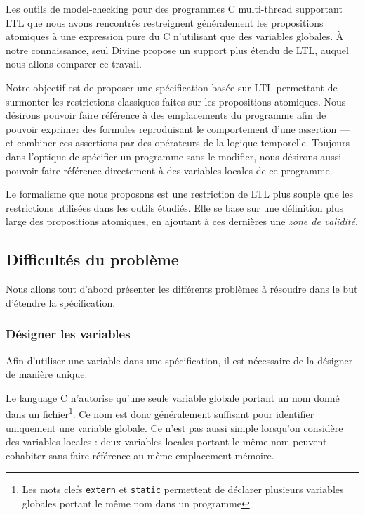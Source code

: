 Les outils de model-checking pour des programmes C multi-thread
supportant LTL que nous avons rencontrés restreignent généralement les
propositions atomiques à une expression pure du C n'utilisant que des
variables globales. À notre connaissance, seul
Divine\cite{Divine_LTL} propose un support plus étendu de LTL,
auquel nous allons comparer ce travail.

Notre objectif est de proposer une spécification basée sur LTL
permettant de surmonter les restrictions classiques faites sur les
propositions atomiques. Nous désirons pouvoir faire référence à des
emplacements du programme afin de pouvoir exprimer des formules
reproduisant le comportement d'une assertion --- et combiner ces
assertions par des opérateurs de la logique temporelle. Toujours dans
l'optique de spécifier un programme sans le modifier, nous désirons
aussi pouvoir faire référence directement à des variables locales de ce
programme.

Le formalisme que nous proposons est une restriction de LTL plus souple
que les restrictions utilisées dans les outils étudiés. Elle se base sur
une définition plus large des propositions atomiques, en ajoutant à ces
dernières une \emph{zone de validité}.

\subsection{Difficultés du problème}

Nous allons tout d'abord présenter les différents problèmes à résoudre
dans le but d'étendre la spécification.

\subsubsection{Désigner les variables}

Afin d'utiliser une variable dans une spécification, il est nécessaire
de la désigner de manière unique.

Le language C n'autorise qu'une seule variable globale portant un nom
donné dans un fichier\footnote{Les mots clefs \texttt{extern} et
\texttt{static} permettent de déclarer plusieurs variables globales
portant le même nom dans un programme}. Ce nom est donc généralement
suffisant pour identifier uniquement une variable globale. Ce n'est pas
aussi simple lorsqu'on considère des variables locales : deux variables
locales portant le même nom peuvent cohabiter sans faire référence au
même emplacement mémoire.

